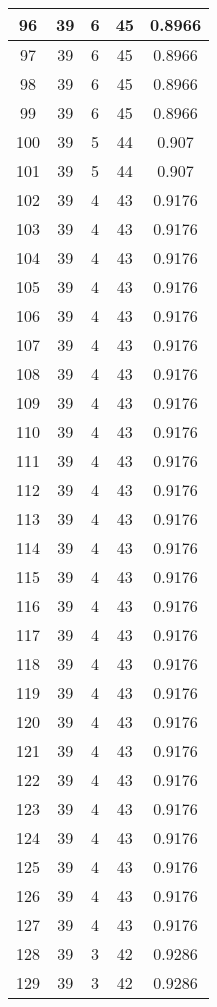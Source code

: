 \documentclass[letterpaper, 12pt]{article}
\begin{document}
\begin{longtable}{|c|c|c|c|c|}
\hline
96 & 39 & 6 & 45 & 0.8966 \\
\hline
97 & 39 & 6 & 45 & 0.8966 \\
\hline
98 & 39 & 6 & 45 & 0.8966 \\
\hline
99 & 39 & 6 & 45 & 0.8966 \\
\hline
100 & 39 & 5 & 44 & 0.907 \\
\hline
101 & 39 & 5 & 44 & 0.907 \\
\hline
102 & 39 & 4 & 43 & 0.9176 \\
\hline
103 & 39 & 4 & 43 & 0.9176 \\
\hline
104 & 39 & 4 & 43 & 0.9176 \\
\hline
105 & 39 & 4 & 43 & 0.9176 \\
\hline
106 & 39 & 4 & 43 & 0.9176 \\
\hline
107 & 39 & 4 & 43 & 0.9176 \\
\hline
108 & 39 & 4 & 43 & 0.9176 \\
\hline
109 & 39 & 4 & 43 & 0.9176 \\
\hline
110 & 39 & 4 & 43 & 0.9176 \\
\hline
111 & 39 & 4 & 43 & 0.9176 \\
\hline
112 & 39 & 4 & 43 & 0.9176 \\
\hline
113 & 39 & 4 & 43 & 0.9176 \\
\hline
114 & 39 & 4 & 43 & 0.9176 \\
\hline
115 & 39 & 4 & 43 & 0.9176 \\
\hline
116 & 39 & 4 & 43 & 0.9176 \\
\hline
117 & 39 & 4 & 43 & 0.9176 \\
\hline
118 & 39 & 4 & 43 & 0.9176 \\
\hline
119 & 39 & 4 & 43 & 0.9176 \\
\hline
120 & 39 & 4 & 43 & 0.9176 \\
\hline
121 & 39 & 4 & 43 & 0.9176 \\
\hline
122 & 39 & 4 & 43 & 0.9176 \\
\hline
123 & 39 & 4 & 43 & 0.9176 \\
\hline
124 & 39 & 4 & 43 & 0.9176 \\
\hline
125 & 39 & 4 & 43 & 0.9176 \\
\hline
126 & 39 & 4 & 43 & 0.9176 \\
\hline
127 & 39 & 4 & 43 & 0.9176 \\
\hline
128 & 39 & 3 & 42 & 0.9286 \\
\hline
129 & 39 & 3 & 42 & 0.9286 \\

\end{longtable}
\end{document}
